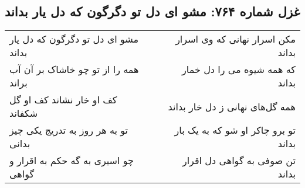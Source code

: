 \begin{center}
\section*{غزل شماره ۷۶۴: مشو ای دل تو دگرگون که دل یار بداند}
\label{sec:0764}
\begin{longtable}{l p{0.5cm} r}
مشو ای دل تو دگرگون که دل یار بداند
&&
مکن اسرار نهانی که وی اسرار بداند
\\
همه را از تو چو خاشاک بر آن آب براند
&&
که همه شیوه می را دل خمار بداند
\\
کف او خار نشاند کف او گل شکفاند
&&
همه گل‌های نهانی ز دل خار بداند
\\
تو به هر روز به تدریج یکی چیز بدانی
&&
تو برو چاکر او شو که به یک بار بداند
\\
چو اسیری به گه حکم به اقرار و گواهی
&&
تن صوفی به گواهی دل اقرار بداند
\\
\end{longtable}
\end{center}
